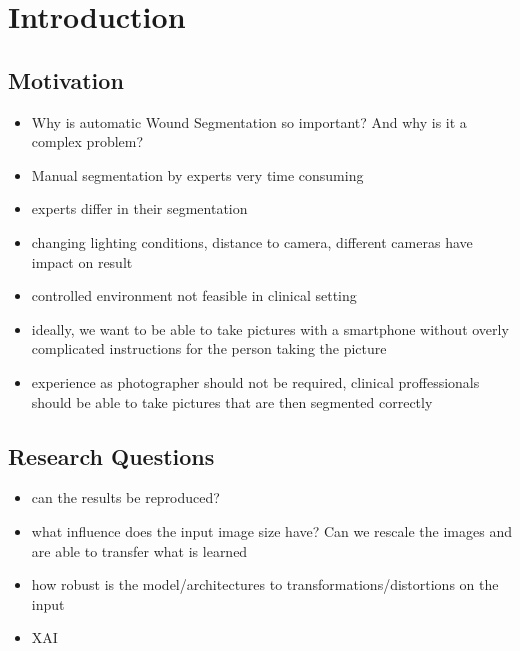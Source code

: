 \section{Introduction}

\subsection{Motivation}

\begin{itemize}
	\item Why is automatic Wound Segmentation so important? And why is it a complex problem?
	\item Manual segmentation by experts very time consuming
	\item experts differ in their segmentation
	\item changing lighting conditions, distance to camera, different cameras have impact on result
	\item controlled environment not feasible in clinical setting
	\item ideally, we want to be able to take pictures with a smartphone without overly complicated instructions for the person taking the picture
	\item experience as photographer should not be required, clinical proffessionals should be able to take pictures that are then segmented correctly
\end{itemize}


\subsection{Research Questions}

\begin{itemize}
	\item can the results be reproduced?
	\item what influence does the input image size have? Can we rescale the images and are able to transfer what is learned
	\item how robust is the model/architectures to transformations/distortions on the input
	\item XAI
\end{itemize}